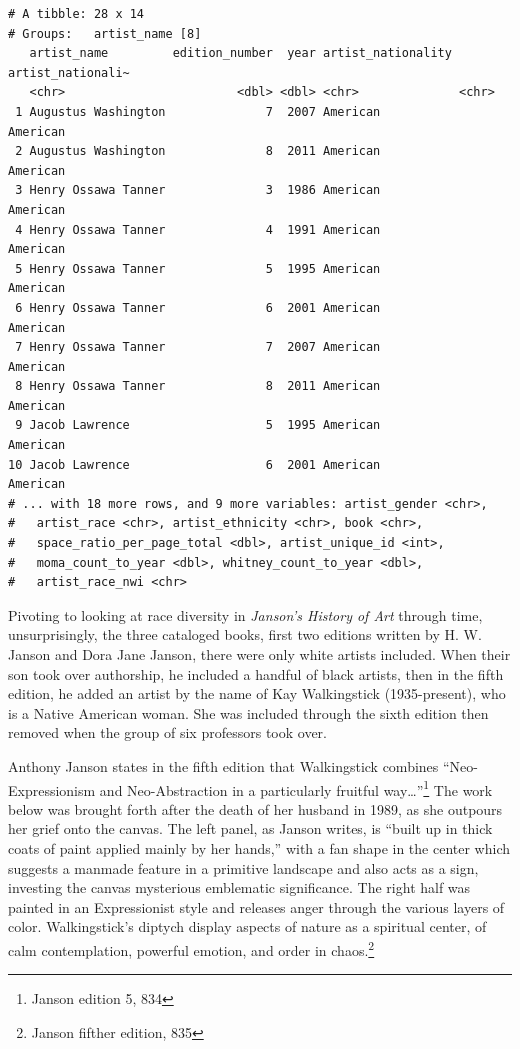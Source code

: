 \documentclass[
  letterpaper,
  DIV=11,
  numbers=noendperiod]{scrreprt}
\begin{document}
\begin{verbatim}
# A tibble: 28 x 14
# Groups:   artist_name [8]
   artist_name         edition_number  year artist_nationality artist_nationali~
   <chr>                        <dbl> <dbl> <chr>              <chr>            
 1 Augustus Washington              7  2007 American           American         
 2 Augustus Washington              8  2011 American           American         
 3 Henry Ossawa Tanner              3  1986 American           American         
 4 Henry Ossawa Tanner              4  1991 American           American         
 5 Henry Ossawa Tanner              5  1995 American           American         
 6 Henry Ossawa Tanner              6  2001 American           American         
 7 Henry Ossawa Tanner              7  2007 American           American         
 8 Henry Ossawa Tanner              8  2011 American           American         
 9 Jacob Lawrence                   5  1995 American           American         
10 Jacob Lawrence                   6  2001 American           American         
# ... with 18 more rows, and 9 more variables: artist_gender <chr>,
#   artist_race <chr>, artist_ethnicity <chr>, book <chr>,
#   space_ratio_per_page_total <dbl>, artist_unique_id <int>,
#   moma_count_to_year <dbl>, whitney_count_to_year <dbl>,
#   artist_race_nwi <chr>
\end{verbatim}

Pivoting to looking at race diversity in \emph{Janson's History of Art}
through time, unsurprisingly, the three cataloged books, first two
editions written by H. W. Janson and Dora Jane Janson, there were only
white artists included. When their son took over authorship, he included
a handful of black artists, then in the fifth edition, he added an
artist by the name of Kay Walkingstick (1935-present), who is a Native
American woman. She was included through the sixth edition then removed
when the group of six professors took over.

Anthony Janson states in the fifth edition that Walkingstick combines
``Neo-Expressionism and Neo-Abstraction in a particularly fruitful
way\ldots{}''\footnote{Janson edition 5, 834} The work below was brought
forth after the death of her husband in 1989, as she outpours her grief
onto the canvas. The left panel, as Janson writes, is ``built up in
thick coats of paint applied mainly by her hands,'' with a fan shape in
the center which suggests a manmade feature in a primitive landscape and
also acts as a sign, investing the canvas mysterious emblematic
significance. The right half was painted in an Expressionist style and
releases anger through the various layers of color. Walkingstick's
diptych display aspects of nature as a spiritual center, of calm
contemplation, powerful emotion, and order in chaos.\footnote{Janson
  fifther edition, 835}
\end{document}

